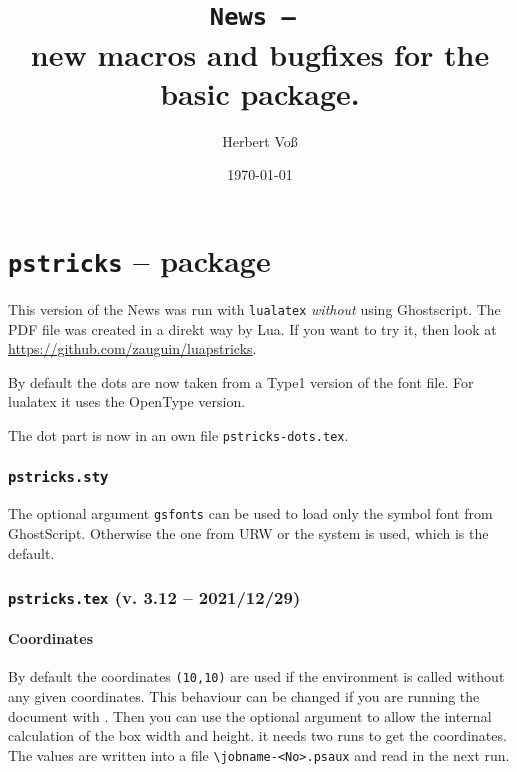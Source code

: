 \documentclass[11pt,english,BCOR=10mm,DIV=12,bibliography=totoc,parskip=false,headings=small,
    headinclude=false,footinclude=false,twoside,usegeometry,dvipsnames]{pst-doc}
\begin{document}
\title{\texttt{News -- \the\year}\\ \Large new macros and bugfixes for the basic package.}
\author{Herbert Voß}
\date{\today}

\settitle

\tableofcontents

\part{\texttt{pstricks} -- package}

This version of the News was run with \verb|lualatex| \emph{without} using Ghostscript.
The PDF file was created in a direkt way by Lua. If you want to try it, then look
at \url{https://github.com/zauguin/luapstricks}.

By default the dots are now taken from a Type1 version of the font file. For
lualatex it uses the OpenType version.

The dot part is now in an own file \texttt{pstricks-dots.tex}.





\section{\texttt{pstricks.sty}}
The optional argument \texttt{gsfonts} can be used to load only the symbol font from GhostScript.
Otherwise the one from URW or the system is used, which is the default.



\section{\texttt{pstricks.tex} (v. 3.12 -- 2021/12/29)}


\subsection{Coordinates}
By default the coordinates \verb|(10,10)| are used if the environment 
is called without any given coordinates. This behaviour can be changed if you are running
the document with . Then you can use the optional argument 
to allow the internal calculation of the box width and height. it needs two 
runs to get the coordinates. The values are written into a file \verb|\jobname-<No>.psaux| and read
in the next run.
\end{document}
